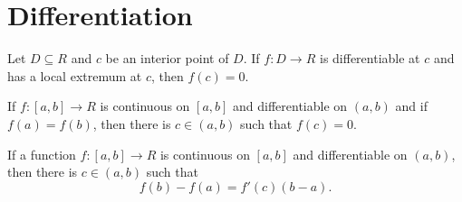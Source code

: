 \documentclass[a4paper,oneside]{book}
\begin{document}
\chapter{Differentiation}
\begin{lemma}
Let $D \subseteq R$ and $c$ be an interior point of $D$. If $f : D \to R$ is
differentiable at $c$ and has a local extremum at $c$, then $f (c) = 0$.
\end{lemma}
\begin{proposition}
If $f : \left[a,b\right] \to R$ is continuous on $\left[a,b\right]$ and differentiable on $(a, b)$ and if $f (a) = f (b)$, then there is $c \in (a, b)$
such that $f (c) = 0$.
\end{proposition}
\begin{proposition}
If a function $f : \left[a,b\right] \to R$ is continuous on $\left[a,b\right]$ and differentiable on $(a, b)$, then there is $c \in (a, b)$ such that
$$f (b) - f (a) = f'(c)(b - a).$$
\end{proposition}
\end{document}
